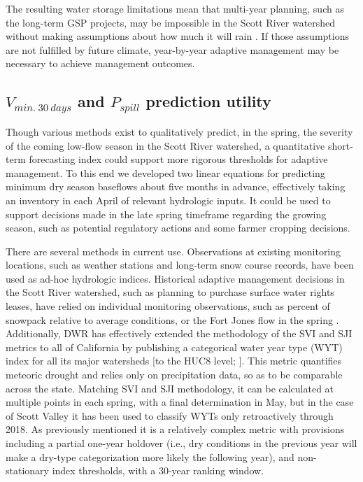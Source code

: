 \documentclass[hess, manuscript]{copernicus}
\begin{document}
The resulting water storage limitations mean that multi-year planning,
such as the long-term GSP projects, may be impossible in the Scott River
watershed without making assumptions about how much it will rain
\citeyearpar[i.e., the future climate predictions in Siskiyou
County][]{SiskiyouCounty2021}. If those assumptions are not fulfilled by
future climate, year-by-year adaptive management may be necessary to
achieve management outcomes.

\subsection{\texorpdfstring{\(V_{min.~30~days}\) and \(P_{spill}\)
prediction
utility}{V\_\{min.\textasciitilde30\textasciitilde days\} and P\_\{spill\} prediction utility}}

Though various methods exist to qualitatively predict, in the spring,
the severity of the coming low-flow season in the Scott River watershed,
a quantitative short-term forecasting index could support more rigorous
thresholds for adaptive management. To this end we developed two linear
equations for predicting minimum dry season baseflows about five months
in advance, effectively taking an inventory in each April of relevant
hydrologic inputs. It could be used to support decisions made in the
late spring timeframe regarding the growing season, such as potential
regulatory actions and some farmer cropping decisions.

There are several methods in current use. Observations at existing
monitoring locations, such as weather stations and long-term snow course
records, have been used as ad-hoc hydrologic indices. Historical
adaptive management decisions in the Scott River watershed, such as
planning to purchase surface water rights leases, have relied on
individual monitoring observations, such as percent of snowpack relative
to average conditions, or the Fort Jones flow in the spring
\citep[e.g.,][]{SRWT2018}. Additionally, DWR has effectively extended
the methodology of the SVI and SJI metrics to all of California by
publishing a categorical water year type (WYT) index for all its major
watersheds {[}to the HUC8 level; \citet{DWR2021a}{]}. This metric
quantifies meteoric drought and relies only on precipitation data, so as
to be comparable across the state. Matching SVI and SJI methodology, it
can be calculated at multiple points in each spring, with a final
determination in May, but in the case of Scott Valley it has been used
to classify WYTs only retroactively through 2018. As previously
mentioned it is a relatively complex metric with provisions including a
partial one-year holdover (i.e., dry conditions in the previous year
will make a dry-type categorization more likely the following year), and
non-stationary index thresholds, with a 30-year ranking window.
\end{document}
